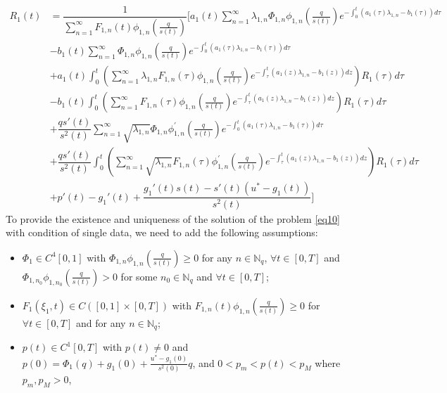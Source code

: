 \documentclass[preprint,12pt,authoryear]{elsarticle}
\begin{document}
\begin{equation}\label{eq43}
    \begin{split}
        R_1(t)&=\dfrac{1}{\sum\limits_{n=1}^{\infty}F_{1,n}(t)\phi_{1,n}\left(\frac{q}{s(t)}\right)}\Bigg[a_1(t)\sum\limits_{n=1}^{\infty}\lambda_{1,n}\Phi_{1,n}\phi_{1,n}\left(\frac{q}{s(t)}\right)e^{-\int_0^t(a_1(\tau)\lambda_{1,n}-b_1(\tau))d\tau}\\
        &-b_1(t)\sum\limits_{n=1}^{\infty}\Phi_{1,n}\phi_{1,n}\left(\frac{q}{s(t)}\right)e^{-\int_0^t(a_1(\tau)\lambda_{1,n}-b_1(\tau))d\tau}\\
        &+a_1(t)\int_0^t\left(\sum\limits_{n=1}^{\infty}\lambda_{1,n}F_{1,n}(\tau)\phi_{1,n}\left(\frac{q}{s(t)}\right)e^{-\int_{\tau}^t(a_1(z)\lambda_{1,n}-b_1(z))dz}\right)R_1(\tau)d\tau\\
        &-b_1(t)\int_0^t\left(\sum\limits_{n=1}^{\infty}F_{1,n}(\tau)\phi_{1,n}\left(\frac{q}{s(t)}\right)e^{-\int_{\tau}^t(a_1(z)\lambda_{1,n}-b_1(z))dz}\right)R_1(\tau)d\tau\\
        &+\dfrac{qs'(t)}{s^2(t)}\sum\limits_{n=1}^{\infty}\sqrt{\lambda_{1,n}}\Phi_{1,n}\phi_{1,n}^{\prime}\left(\frac{q}{s(t)}\right)e^{-\int_0^t(a_1(\tau)\lambda_{1,n}-b_1(\tau))d\tau}\\
        &+\dfrac{qs'(t)}{s^2(t)}\int_0^t\left(\sum\limits_{n=1}^{\infty}\sqrt{\lambda_{1,n}}F_{1,n}(\tau)\phi_{1,n}^{\prime}\left(\frac{q}{s(t)}\right)e^{-\int_{\tau}^t(a_1(z)\lambda_{1,n}-b_1(z))dz}\right)R_1(\tau)d\tau\\
        &+p'(t)-g_1'(t)+\dfrac{g_1'(t)s(t)-s'(t)(u^*-g_1(t))}{s^2(t)}\Bigg]
    \end{split}
\end{equation}
To provide the existence and uniqueness of the solution of the problem \eqref{eq10} with condition of single data, we need to add the following assumptions:
\begin{itemize}
    \item[(vii)] $\Phi_1\in C^4[0,1]$ with $\Phi_{1,n}\phi_{1,n}\left(\frac{q}{s(t)}\right)\geq 0$ for any $n\in\mathbb{N}_q$, $\forall t\in[0,T]$ and $\Phi_{1,n_0}\phi_{1,n_0}\left(\frac{q}{s(t)}\right)>0$ for some $n_0\in\mathbb{N}_q$ and $\forall t\in[0,T]$;
    \item[(viii)] $F_{1}(\xi_1,t)\in C([0,1]\times[0,T])$ with $F_{1,n}(t)\phi_{1,n}\left(\frac{q}{s(t)}\right)\geq 0$ for $\forall t\in[0,T]$ and for any $n\in\mathbb{N}_q$;
    \item[(ix)] $p(t)\in C^1[0,T]$ with $p(t)\neq 0$ and $p(0)=\Phi_{1}(q)+g_1(0)+\frac{u^*-g_1(0)}{s^2(0)}q$, and $0<p_m<p(t)<p_M$ where $p_m,p_M>0$,
\end{itemize}
\end{document}
